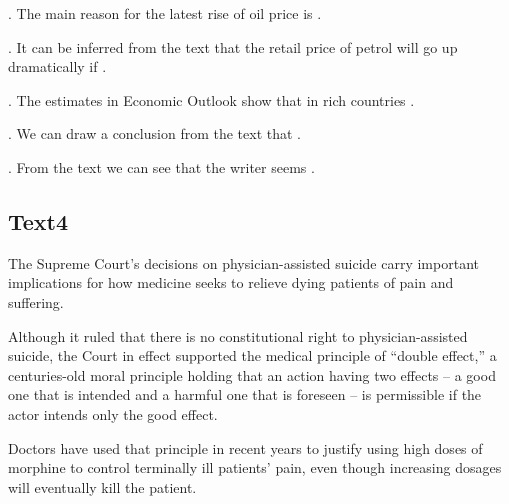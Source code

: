 \begin{questions} 
.	The main reason for the latest rise of oil price is \ltk{}.\\

.	It can be inferred from the text that the retail price of petrol will go up dramatically if \ltk{}.\\

.	The estimates in Economic Outlook show that in rich countries \ltk{}.\\

.	We can draw a conclusion from the text that \ltk{}.\\

.	From the text we can see that the writer seems \ltk{}.\\
\end{questions}

\subsection{Text4}
The Supreme Court’s decisions on physician-assisted suicide carry important implications for how medicine seeks to relieve dying patients of pain and suffering.

Although it ruled that there is no constitutional right to physician-assisted suicide, the Court in effect supported the medical principle of “double effect,” a centuries-old moral principle holding that an action having two effects -- a good one that is intended and a harmful one that is foreseen -- is permissible if the actor intends only the good effect.

Doctors have used that principle in recent years to justify using high doses of morphine to control terminally ill patients’ pain, even though increasing dosages will eventually kill the patient.

